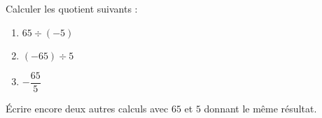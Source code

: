 
\begin{exercice}\label{exosmath-0748}

    Calculer les quotient suivants :
    \begin{multicols}{2}
        \begin{enumerate}
            \item
                \( 65\div (-5)\)
            \item
                \( (-65)\div 5\)
            \item
                \( -\dfrac{ 65 }{ 5 }\)
        \end{enumerate}
    \end{multicols}
    Écrire encore deux autres calculs avec \( 65\) et \( 5\) donnant le même résultat.

\end{exercice}
